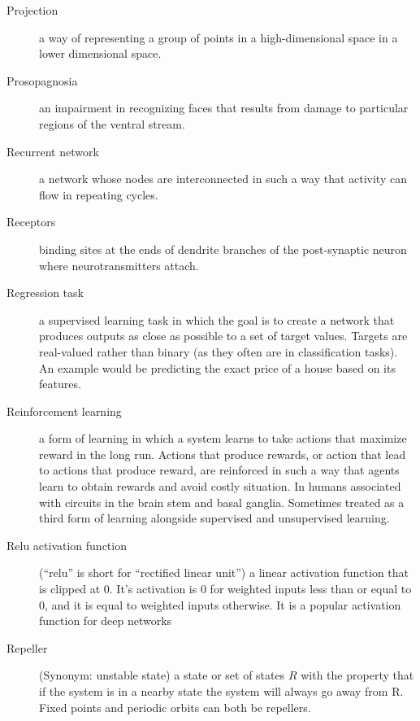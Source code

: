 \begin{description}
\item[Projection] a way of representing a group of points in a high-dimensional space in a lower dimensional space.

\item[Prosopagnosia] an impairment in recognizing faces that results from damage to particular regions of the ventral stream.


\item[Recurrent network] a network whose nodes are interconnected in such a way that activity can flow in repeating cycles.

\item[Receptors] binding sites at the ends of dendrite branches of the post-synaptic neuron where neurotransmitters attach.


\item[Regression task] a supervised learning task in which the goal is to create a network that produces outputs as close as possible to a set of target values. Targets are real-valued rather than binary (as they often are in classification tasks). An example would be predicting the exact price of a house based on its features.

\item[Reinforcement learning] a form of learning in which a system learns to take actions that maximize reward in the long run.   Actions that produce rewards, or action that lead to actions that produce reward, are reinforced in such a way that agents learn to obtain rewards and avoid costly situation.  In humans associated with circuits in the brain stem and basal ganglia.  Sometimes treated as a third form of learning alongside supervised and unsupervised learning.

\item[Relu activation function] (``relu'' is short for ``rectified linear unit'') a linear activation function that is clipped at  0. It's activation is 0 for weighted inputs less than or equal to 0, and it is equal to weighted inputs otherwise. It is a popular activation function for deep networks

\item[Repeller] (Synonym: unstable state) a state or set of states $R$ with the property that if the system is in a nearby state the system will always go away from R. Fixed points and periodic orbits can both be repellers.


\end{description}
